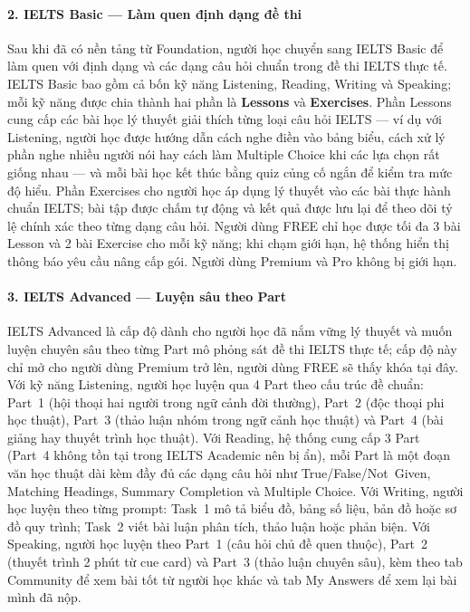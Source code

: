 \paragraph{2. IELTS Basic --- Làm quen định dạng đề thi}

Sau khi đã có nền tảng từ Foundation, người học chuyển sang IELTS Basic để làm quen với định dạng và các dạng câu hỏi chuẩn trong đề thi IELTS thực tế. IELTS Basic bao gồm cả bốn kỹ năng Listening, Reading, Writing và Speaking; mỗi kỹ năng được chia thành hai phần là \textbf{Lessons} và \textbf{Exercises}. Phần Lessons cung cấp các bài học lý thuyết giải thích từng loại câu hỏi IELTS --- ví dụ với Listening, người học được hướng dẫn cách nghe điền vào bảng biểu, cách xử lý phần nghe nhiều người nói hay cách làm Multiple Choice khi các lựa chọn rất giống nhau --- và mỗi bài học kết thúc bằng quiz củng cố ngắn để kiểm tra mức độ hiểu. Phần Exercises cho người học áp dụng lý thuyết vào các bài thực hành chuẩn IELTS; bài tập được chấm tự động và kết quả được lưu lại để theo dõi tỷ lệ chính xác theo từng dạng câu hỏi. Người dùng FREE chỉ học được tối đa 3 bài Lesson và 2 bài Exercise cho mỗi kỹ năng; khi chạm giới hạn, hệ thống hiển thị thông báo yêu cầu nâng cấp gói. Người dùng Premium và Pro không bị giới hạn.

\paragraph{3. IELTS Advanced --- Luyện sâu theo Part}

IELTS Advanced là cấp độ dành cho người học đã nắm vững lý thuyết và muốn luyện chuyên sâu theo từng Part mô phỏng sát đề thi IELTS thực tế; cấp độ này chỉ mở cho người dùng Premium trở lên, người dùng FREE sẽ thấy khóa tại đây. Với kỹ năng Listening, người học luyện qua 4 Part theo cấu trúc đề chuẩn: Part~1 (hội thoại hai người trong ngữ cảnh đời thường), Part~2 (độc thoại phi học thuật), Part~3 (thảo luận nhóm trong ngữ cảnh học thuật) và Part~4 (bài giảng hay thuyết trình học thuật). Với Reading, hệ thống cung cấp 3 Part (Part~4 không tồn tại trong IELTS Academic nên bị ẩn), mỗi Part là một đoạn văn học thuật dài kèm đầy đủ các dạng câu hỏi như True/False/Not~Given, Matching Headings, Summary Completion và Multiple Choice. Với Writing, người học luyện theo từng prompt: Task~1 mô tả biểu đồ, bảng số liệu, bản đồ hoặc sơ đồ quy trình; Task~2 viết bài luận phân tích, thảo luận hoặc phản biện. Với Speaking, người học luyện theo Part~1 (câu hỏi chủ đề quen thuộc), Part~2 (thuyết trình 2 phút từ cue card) và Part~3 (thảo luận chuyên sâu), kèm theo tab Community để xem bài tốt từ người học khác và tab My Answers để xem lại bài mình đã nộp.

